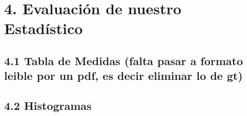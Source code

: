 \documentclass[
]{article}
\begin{document}
\hypertarget{evaluaciuxf3n-de-nuestro-estaduxedstico}{%
\section{4. Evaluación de nuestro
Estadístico}\label{evaluaciuxf3n-de-nuestro-estaduxedstico}}

\hypertarget{tabla-de-medidas-falta-pasar-a-formato-leible-por-un-pdf-es-decir-eliminar-lo-de-gt}{%
\subsection{4.1 Tabla de Medidas (falta pasar a formato leible por un
pdf, es decir eliminar lo de
gt)}\label{tabla-de-medidas-falta-pasar-a-formato-leible-por-un-pdf-es-decir-eliminar-lo-de-gt}}

\newpage

\hypertarget{histogramas}{%
\subsection{4.2 Histogramas}\label{histogramas}}
\end{document}
